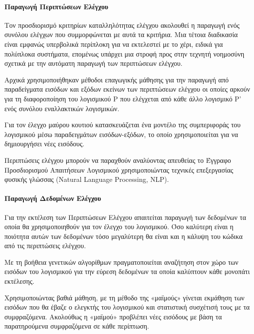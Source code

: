 \documentclass[12pt]{article}
\begin{document}
\paragraph{Παραγωγή Περιπτώσεων Ελέγχου}
Τον προσδιορισμό κριτηρίων καταλληλότητας ελέγχου ακολουθεί η παραγωγή ενός συνόλου ελέγχων που συμμορφώνεται με αυτά τα κριτήρια. Μια τέτοια διαδικασία είναι εμφανώς υπερβολικά περίπλοκη για να εκτελεστεί με το χέρι, ειδικά για πολύπλοκα συστήματα, επομένως υπάρχει μια στροφή προς στην τεχνητή νοημοσύνη σχετικά με την αυτόματη παραγωγή των περιπτώσεων ελέγχου.
\par Αρχικά χρησιμοποιήθηκαν μέθοδοι επαγωγικής μάθησης για την παραγωγή από παραδείγματα εισόδων και εξόδων εκείνων των περιπτώσεων ελέγχου οι οποίες αρκούν για τη διαφοροποίηση του λογισμικού P που ελέγχεται από κάθε άλλο λογισμικό P’ ενός συνόλου εναλλακτικών λογισμικών.
\par Για τον έλεγχο μαύρου κουτιού κατασκευάζεται ένα μοντέλο της συμπεριφοράς του λογισμικού μέσω παραδειγμάτων εισόδων-εξόδων, το οποίο χρησιμοποιείται για να δημιουργήσει νέες εισόδους.
\par Περιπτώσεις ελέγχου μπορούν να παραχθούν αναλύοντας απευθείας το Έγγραφο Προσδιορισμού Απαιτήσεων Λογισμικού χρησιμοποιώντας τεχνικές επεξεργασίας φυσικής γλώσσας (Natural Language Processing, NLP).

\paragraph{Παραγωγή Δεδομένων Ελέγχου}
Για την εκτέλεση των Περιπτώσεων Ελέγχου απαιτείται παραγωγή των δεδομένων τα οποία θα χρησιμοποιηθούν για τον έλεγχο του λογισμικού. Όσο καλύτερη είναι η ποιότητα αυτών των δεδομένων τόσο μεγαλύτερη θα είναι και η κάλυψη του κώδικα από τις περιπτώσεις ελέγχου.
\par Με τη βοήθεια γενετικών αλγορίθμων πραγματοποιείται αναζήτηση στον χώρο των εισόδων του λογισμικού για την εύρεση δεδομένων τα οποία καλύπτουν κάθε μονοπάτι εκτέλεσης.
\par Χρησιμοποιώντας βαθιά μάθηση, με τη μέθοδο της «μαϊμούς» γίνεται εκμάθηση των εισόδων που θα έβαζε ο ελεγκτής του λογισμικού και στατιστική συσχέτισή τους με τα συμφραζόμενα. Ακολούθως η «μαϊμού» προβλέπει νέες εισόδους με βάση τα παρατηρούμενα συμφραζόμενα σε κάθε περίπτωση.
\end{document}

